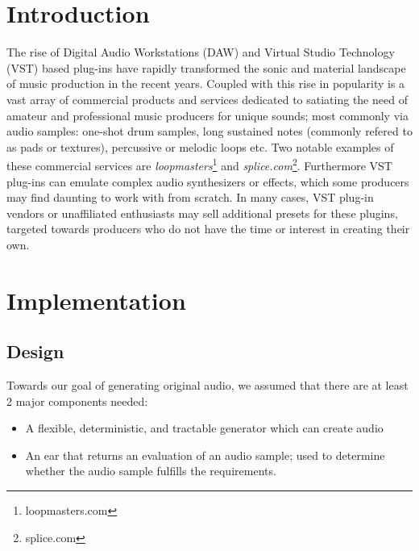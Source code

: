 \documentclass{nime-alternate} %
\begin{document}
\section{Introduction}
The rise of Digital Audio Workstations (DAW) \cite{leider2004digital} and Virtual Studio Technology (VST) based plug-ins \cite{tanev2013virtual} have rapidly transformed the sonic and material landscape of music production in the recent years. Coupled with this rise in popularity is a vast array of commercial products and services dedicated to satiating the need of amateur and professional music producers for unique sounds; most commonly via audio samples: one-shot drum samples, long sustained notes (commonly refered to as pads or textures), percussive or melodic loops etc. Two notable examples of these commercial services are \textit{loopmasters}\footnote{loopmasters.com} and \textit{splice.com}\footnote{splice.com}. Furthermore VST plug-ins can emulate complex audio synthesizers or effects, which some producers may find daunting to work with from scratch. In many cases, VST plug-in vendors or unaffiliated enthusiasts may sell additional presets for these plugins, targeted towards producers who do not have the time or interest in creating their own.\\
\section{Implementation}
\subsection{Design}
Towards our goal of generating original audio, we assumed that there are at least 2 major components needed:
\begin{itemize}
    \item A flexible, deterministic, and tractable generator which can create audio
    \item An ear that returns an evaluation of an audio sample; used to determine whether the audio sample fulfills the requirements. 
\end{itemize}
\end{document}

